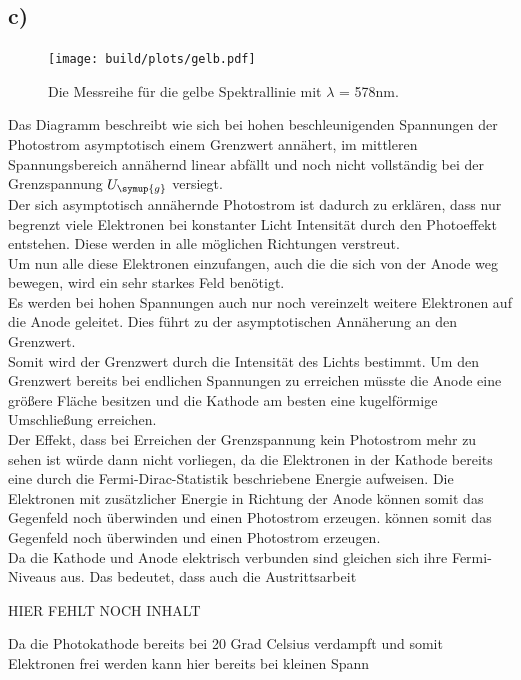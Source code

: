     \subsection{c)}

    \begin{figure}[H]
        \centering
        \texttt{[image: build/plots/gelb.pdf]}
        \caption{Die Messreihe für die gelbe Spektrallinie mit $\lambda$ = 578nm.}
        \label{img:gelb}
    \end{figure}

    \noindent
    Das Diagramm beschreibt wie sich bei hohen beschleunigenden Spannungen der Photostrom asymptotisch einem Grenzwert annähert, im mittleren 
    Spannungsbereich annähernd linear abfällt und noch nicht vollständig bei der Grenzspannung $U_{\symup{g}}$ versiegt.\\
    Der sich asymptotisch annähernde Photostrom ist dadurch zu erklären, dass nur begrenzt viele Elektronen bei konstanter Licht Intensität 
    durch den Photoeffekt entstehen. Diese werden in alle möglichen Richtungen verstreut.\\
    Um nun alle diese Elektronen einzufangen, auch die die sich  
    von der Anode weg bewegen, wird ein sehr starkes Feld benötigt.\\
    Es werden bei hohen Spannungen auch nur noch vereinzelt
    weitere Elektronen auf die Anode geleitet. Dies führt zu der asymptotischen Annäherung an den Grenzwert.\\
    Somit wird der Grenzwert durch die 
    Intensität des Lichts bestimmt. Um den Grenzwert bereits bei endlichen Spannungen zu erreichen müsste die Anode eine größere Fläche besitzen
    und die Kathode am besten eine kugelförmige Umschließung erreichen.\\
    Der Effekt, dass bei Erreichen der Grenzspannung kein Photostrom mehr zu sehen ist würde dann nicht vorliegen, da die Elektronen in der Kathode 
    bereits eine durch die Fermi-Dirac-Statistik beschriebene Energie aufweisen. Die Elektronen mit zusätzlicher Energie in Richtung der Anode 
    können somit das Gegenfeld noch überwinden und einen Photostrom erzeugen.
    können somit das Gegenfeld noch überwinden und einen Photostrom erzeugen.\\
    Da die Kathode und Anode elektrisch verbunden sind gleichen sich ihre Fermi-Niveaus aus. 
    Das bedeutet, dass auch die Austrittsarbeit 
    
    HIER FEHLT NOCH INHALT
    
    Da die Photokathode bereits bei 20 Grad Celsius verdampft und somit Elektronen frei werden kann hier bereits bei kleinen Spann

    

